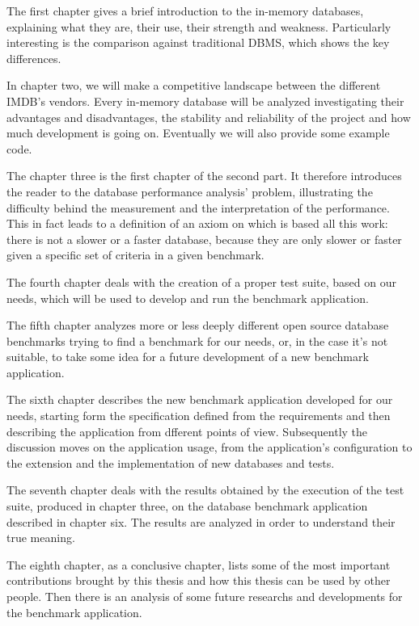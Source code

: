 The first chapter gives a brief introduction to the in-memory databases, explaining what they are, their use, their strength and weakness. Particularly interesting is the comparison against traditional DBMS, which shows the key differences. 

In chapter two, we will make a competitive landscape between the different IMDB's vendors. Every in-memory database will be analyzed investigating their advantages and disadvantages, the stability and reliability of the project and how much development is going on. Eventually we will also provide some example code.

The chapter three is the first chapter of the second part. It therefore introduces the reader to the database performance analysis' problem, illustrating the difficulty behind the measurement and the interpretation of the performance. This in fact leads to a definition of an axiom on which is based all this work: there is not a slower or a faster database, because they are only slower or faster given a specific set of criteria in a given benchmark.

The fourth chapter deals with the creation of a proper test suite, based on our needs, which will be used to develop and run the benchmark application.

The fifth chapter analyzes more or less deeply different open source database benchmarks trying to find a benchmark for our needs, or, in the case it's not suitable, to take some idea for a future development of a new benchmark application.

The sixth chapter describes the new benchmark application developed for our needs, starting form the specification defined from the requirements and then describing the application from dfferent points of view. Subsequently the discussion moves on the application usage, from the application's configuration to the extension and the implementation of new databases and tests.

The seventh chapter deals with the results obtained by the execution of the test suite, produced in chapter three, on the database benchmark application described in chapter six. The results are analyzed in order to understand their true meaning.

The eighth chapter, as a conclusive chapter, lists some of the most important contributions brought by this thesis and how this thesis can be used by other people. Then there is an analysis of some future researchs and developments for the benchmark application.